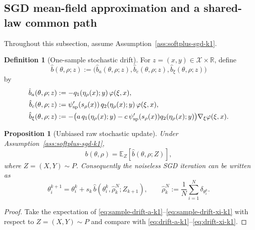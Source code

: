 \documentclass[11pt]{article}
\newtheorem{proposition}[theorem]{Proposition}
\theoremstyle{definition}
\newtheorem{definition}[theorem]{Definition}
\newcommand{\R}{\mathbb{R}}
\newcommand{\E}{\mathbb{E}}
\newcommand{\mc}[1]{\mathcal{#1}}
\begin{document}
\subsection{SGD mean-field approximation and a shared-law common path}

Throughout this subsection, assume Assumption~\ref{ass:softplus-sgd-k1}.

\begin{definition}[One-sample stochastic drift]
\label{def:sample-drift-k1}
For $z=(x,y)\in \mc{X}\times\R$, define
\[
  \hat b(\theta,\rho;z)
  :=
  \bigl(\hat b_a(\theta,\rho;z),\hat b_c(\theta,\rho;z),\hat b_\xi(\theta,\rho;z)\bigr)
\]
by
\begin{align}
  \hat b_a(\theta,\rho;z)
  &:=
  -q_1(\eta_\rho(x);y)\,\varphi(\xi,x),
  \label{eq:sample-drift-a-k1}
  \\
  \hat b_c(\theta,\rho;z)
  &:=
  \psi'_{\rm sp}(s_\rho(x))\,q_2(\eta_\rho(x);y)\,\varphi(\xi,x),
  \label{eq:sample-drift-c-k1}
  \\
  \hat b_\xi(\theta,\rho;z)
  &:=
  -
  \bigl(
    a\,q_1(\eta_\rho(x);y)
    -
    c\,\psi'_{\rm sp}(s_\rho(x))q_2(\eta_\rho(x);y)
  \bigr)\nabla_\xi\varphi(\xi,x).
  \label{eq:sample-drift-xi-k1}
\end{align}
\end{definition}

\begin{proposition}[Unbiased raw stochastic update]
\label{prop:unbiased-sample-drift-k1}
Under Assumption~\ref{ass:softplus-sgd-k1},
\[
  b(\theta,\rho)=\E_Z[\hat b(\theta,\rho;Z)],
\]
where $Z=(X,Y)\sim P$. Consequently the noiseless SGD iteration can be written
as
\begin{equation}
  \theta_i^{k+1}
  =
  \theta_i^k
  +
  s_k\,\hat b(\theta_i^k,\hat\rho_k^N;Z_{k+1}),
  \qquad
  \hat\rho_k^N:=\frac1N\sum_{i=1}^N \delta_{\theta_i^k}.
  \label{eq:sgd-update-k1}
\end{equation}
\end{proposition}

\begin{proof}
Take the expectation of
\eqref{eq:sample-drift-a-k1}--\eqref{eq:sample-drift-xi-k1}
with respect to $Z=(X,Y)\sim P$ and compare with
\eqref{eq:drift-a-k1}--\eqref{eq:drift-xi-k1}.
\end{proof}
\end{document}
